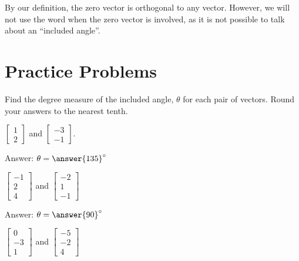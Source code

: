 \documentclass{ximera}
\begin{document}
\begin{remark}  By our definition, the zero vector is orthogonal to any vector.  However, we will not use the word  when the zero vector is involved, as it is not possible to talk about an ``included angle''.
\end{remark}


\section*{Practice Problems}
\begin{problem}%
Find the degree measure of the included angle, $\theta$ for each pair of vectors.  Round your answers to the nearest tenth.
  \begin{problem}\label{prob:anglebetweenvectors1}
  $\begin{bmatrix}1\\2\end{bmatrix}$ and $\begin{bmatrix}-3\\-1\end{bmatrix}$.
  
  Answer: $\theta=\answer{135}^\circ$
  \end{problem}
  
  \begin{problem}\label{prob:anglebetweenvectors2}
  $\begin{bmatrix}-1\\2\\4\end{bmatrix}$ and $\begin{bmatrix}-2\\1\\-1\end{bmatrix}$
  
   Answer: $\theta=\answer{90}^\circ$
  \end{problem}

\begin{problem}\label{prob:anglebetweenvectors3}
  $\begin{bmatrix}0\\-3\\1\end{bmatrix}$ and $\begin{bmatrix}-5\\-2\\4\end{bmatrix}$
  

\end{problem}
\end{problem}
\end{document}
